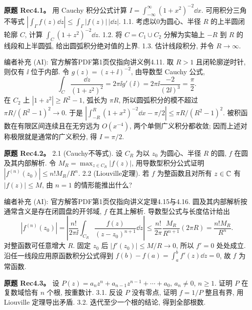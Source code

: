\begin{exercise}
\textbf{原题 Rec4.1。}\label{ass:rec4-1}
用 Cauchy 积分公式计算 $I=\int_{-\infty}^{\infty}(1+x^2)^{-2}\dd x$. 可用积分三角不等式 $|\int_\Gamma f(z)\dd z|\le\int_\Gamma|f(z)|\,|\dd z|$. 1.1. 考虑以0为圆心、半径 $R$ 的上半圆闭轮廓 $C$, 计算 $\int_C(1+z^2)^{-2}\dd z$. 1.2. 将 $C=C_1\cup C_2$ 分解为实轴上 $-R$ 到 $R$ 的线段和上半圆弧, 给出圆弧积分绝对值的上界. 1.3. 估计线段积分, 并令 $R\to\infty$.
\end{exercise}
\begin{solution}
编者补充 (AI): 官方解答PDF第1页仅指向讲义例4.11. 取 $R>1$ 且闭轮廓逆时针, 则仅有 $\ii$ 位于内部. 令 $g(z)=(z+\ii)^{-2}$, 由导数型 Cauchy 公式,
\[
\int_C\frac{\dd z}{(1+z^2)^2}=2\pi\ii g'(\ii)
=2\pi\ii\frac{-2}{(2\ii)^3}=\frac\pi2.
\]
在 $C_2$ 上 $|1+z^2|\ge R^2-1$, 弧长为 $\pi R$, 所以圆弧积分的模不超过 $\pi R/(R^2-1)^2\to0$. 于是 $|\int_{-R}^{R}(1+x^2)^{-2}\dd x-\pi/2|\le\pi R/(R^2-1)^2$. 被积函数在有限区间连续且在无穷远为 $O(x^{-4})$, 两个单侧广义积分都收敛; 因而上述对称极限就是通常的广义积分, 得 $I=\pi/2$.
\end{solution}
\begin{exercise}
\textbf{原题 Rec4.2。}\label{ass:rec4-2}
2.1 (Cauchy不等式). 设 $C_R$ 为以 $z_0$ 为圆心、半径 $R$ 的圆, $f$ 在圆及其内部解析. 令 $M_R=\max_{z\in C_R}|f(z)|$, 用导数型积分公式证明 $|f^{(n)}(z_0)|\le n!M_R/R^n$. 2.2 (Liouville定理). 若 $f$ 为整函数且对所有 $z\in\mathbb C$ 有 $|f(z)|\le M$, 由 $n=1$ 的情形能推出什么?
\end{exercise}
\begin{solution}
编者补充 (AI): 官方解答PDF第1页仅指向讲义定理4.15与4.16. 圆及其内部解析按通常含义是存在闭圆盘的开邻域, $f$ 在其上解析. 导数型公式与长度估计给出
\[
|f^{(n)}(z_0)|=\left|\frac{n!}{2\pi\ii}\int_{C_R}\frac{f(z)}{(z-z_0)^{n+1}}\dd z\right|
\le\frac{n!}{2\pi}\frac{M_R}{R^{n+1}}(2\pi R)=\frac{n!M_R}{R^n}.
\]
对整函数可任意增大 $R$. 固定 $z_0$ 后 $|f'(z_0)|\le M/R\to0$, 所以 $f'=0$ 处处成立. 沿任一线段应用原函数积分公式得到 $f(b)-f(a)=\int_a^b f'(z)\dd z=0$, 故 $f$ 为常函数.
\end{solution}
\begin{exercise}
\textbf{原题 Rec4.3。}\label{ass:rec4-3}
设 $P(z)=a_nz^n+a_{n-1}z^{n-1}+\cdots+a_0$, $a_n\ne0$, $n\ge1$. 证明 $P$ 在复数域恰有 $n$ 个根, 按重数计. 3.1. 反设 $P$ 没有零点, 证明 $f=1/P$ 整且有界, 用 Liouville 定理导出矛盾. 3.2. 迭代至少一个根的结论, 得到全部根数.
\end{exercise}
